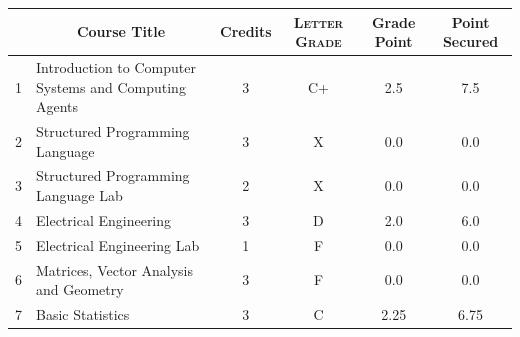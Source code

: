 \documentclass[11pt]{article}
\newcommand*{\numtwo}[1]{\pgfmathprintnumber[
                    fixed, precision=2, fixed zerofill=true]{#1}}
\begin{document}
                \begin{center}
                    \renewcommand{\arraystretch}{1.08}
                    
                \begin{tabular}{|c|l|c|>{\scshape}c|c|c|}
                \hline  \rule[-1ex]{0pt}{3.5ex} {\centering{\bf Course Code}} &  \multicolumn{1}{c|}{\textbf{Course Title}}  & {\bf Credits} & {\bf Letter Grade} & {\bf Grade Point} & {\bf Point Secured}  \\ 
                \hline   1 &  Introduction to Computer Systems and Computing Agents		 & 3 & C+ & 2.5 & 7.5 \\ %
                \hline   2 &  Structured Programming Language		 & 3 & X & 0.0 & 0.0 \\ %
                \hline   3 &  Structured Programming Language Lab		 & 2 & X & 0.0 & 0.0 \\ %
                \hline   4 &  Electrical Engineering		 & 3 & D & 2.0 & 6.0 \\ %
                \hline   5 &  Electrical Engineering Lab		 & 1 & F & 0.0 & 0.0 \\ %
                \hline   6 &  Matrices, Vector Analysis and Geometry		 & 3 & F & 0.0 & 0.0 \\ %
                \hline   7 &  Basic Statistics		 & 3 & C & 2.25 & 6.75 \\ %

\hline                %
                \end{tabular}
                \end{center}
                \renewcommand{\arraystretch}{1.03}
\end{document}
